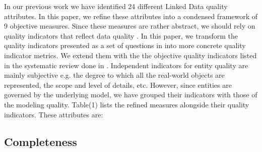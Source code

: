\documentclass[onecolumn, crcready]{iosart2c}
\begin{document}
In our previous work \cite{assaf2012} we have identified 24 different Linked Data quality attributes. In this paper, we refine these attributes into a condensed framework of 9 objective measures. Since these measures are rather abstract, we should rely on quality indicators that reflect data quality \cite{flemming2010}. In this paper, we transform the quality indicators presented as a set of questions in \cite{assaf2012} into more concrete quality indicator metrics. We extend them with the the objective quality indicators listed in the systematic review done in \cite{Framework2012}. Independent indicators for entity quality are mainly subjective e.g. the degree to which all the real-world objects are represented, the scope and level of details, etc. However, since entities are governed by the underlying model, we have grouped their indicators with those of the modeling quality. Table(1) lists the refined measures alongside their quality indicators. These attributes are: \\

 \subsection{Completeness}
\end{document}

